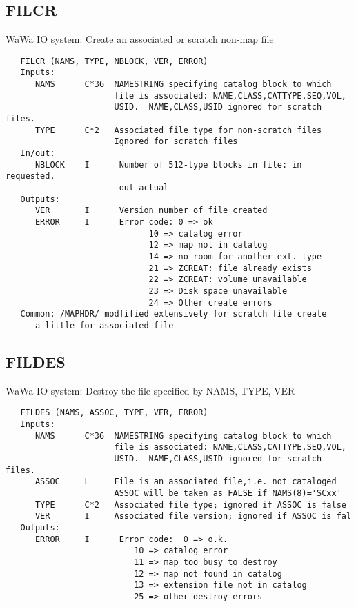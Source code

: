 \subsection{FILCR}
WaWa IO system:  Create an associated or scratch non-map file
\begin{verbatim}
   FILCR (NAMS, TYPE, NBLOCK, VER, ERROR)
   Inputs:
      NAMS      C*36  NAMESTRING specifying catalog block to which
                      file is associated: NAME,CLASS,CATTYPE,SEQ,VOL,
                      USID.  NAME,CLASS,USID ignored for scratch files.
      TYPE      C*2   Associated file type for non-scratch files
                      Ignored for scratch files
   In/out:
      NBLOCK    I      Number of 512-type blocks in file: in requested,
                       out actual
   Outputs:
      VER       I      Version number of file created
      ERROR     I      Error code: 0 => ok
                             10 => catalog error
                             12 => map not in catalog
                             14 => no room for another ext. type
                             21 => ZCREAT: file already exists
                             22 => ZCREAT: volume unavailable
                             23 => Disk space unavailable
                             24 => Other create errors
   Common: /MAPHDR/ modfified extensively for scratch file create
      a little for associated file
\end{verbatim}

\subsection{FILDES}
WaWa IO system: Destroy the file specified by NAMS, TYPE, VER
\begin{verbatim}
   FILDES (NAMS, ASSOC, TYPE, VER, ERROR)
   Inputs:
      NAMS      C*36  NAMESTRING specifying catalog block to which
                      file is associated: NAME,CLASS,CATTYPE,SEQ,VOL,
                      USID.  NAME,CLASS,USID ignored for scratch files.
      ASSOC     L     File is an associated file,i.e. not cataloged
                      ASSOC will be taken as FALSE if NAMS(8)='SCxx'
      TYPE      C*2   Associated file type; ignored if ASSOC is false
      VER       I     Associated file version; ignored if ASSOC is fal
   Outputs:
      ERROR     I      Error code:  0 => o.k.
                          10 => catalog error
                          11 => map too busy to destroy
                          12 => map not found in catalog
                          13 => extension file not in catalog
                          25 => other destroy errors

\end{verbatim}

